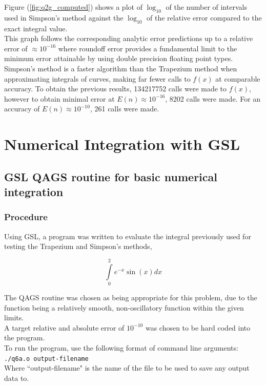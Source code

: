 \documentclass[pdf,color]{UoBnote}
\begin{document}
				Figure (\ref{fig:q2g_computed}) shows a plot of $\log_{10}$ of the number of intervals used in Simpson's method against the $\log_{10}$ of the relative error compared to the exact integral value.\\
				This graph follows the corresponding analytic error predictions up to a relative error of $\approx 10^{-16}$ where roundoff error provides a fundamental limit to the minimum error attainable by using double precision floating point types.\\
				Simpson's method is a faster algorithm than the Trapezium method when approximating integrals of curves, making far fewer calls to $f(x)$ at comparable accuracy. To obtain the previous results, 134217752 calls were made to $f(x)$, however to obtain minimal error at $E(n) \approx 10^{-16}$, 8202 calls were made. For an accuracy of $E(n) \approx 10^{-10}$, 261 calls were made.
				
\section{Numerical Integration with GSL}
	\subsection{GSL QAGS routine for basic numerical integration}
	
		\subsubsection{Procedure}
			Using GSL, a program was written to evaluate the integral previously used for testing the Trapezium and Simpson's methods,
			
			\begin{equation}\label{eq:int1}
				\int\limits_0^2 e^{-x}\sin{(x)} dx	
			\end{equation}
				
			The QAGS routine was chosen as being appropriate for this problem, due to the function being a relatively smooth, non-oscillatory function within the given limits.\\
			A target relative and absolute error of $10^{-10}$ was chosen to be hard coded into the program.\\
			To run the program, use the following format of command line arguments:\\
				\texttt{./q6a.o output-filename}\\
			Where ``output-filename" is the name of the file to be used to save any output data to.
\end{document}
